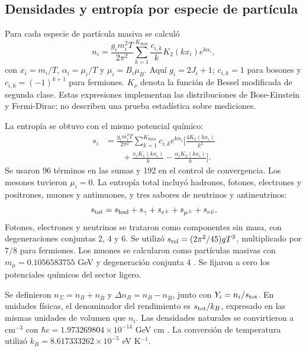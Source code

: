 \subsection{Densidades y entropía por especie de partícula}
Para cada especie de partícula masiva se calculó
\begin{equation}
n_i=\frac{g_i m_i^2T}{2\pi^2}
\sum_{k=1}^{K_{\max}}\frac{c_{i,k}}{k}
K_2(kx_i)e^{k\alpha_i},\label{eq:number}
\end{equation}
con $x_i=m_i/T$, $\alpha_i=\mu_i/T$ y $\mu_i=B_i\mu_B$. Aquí $g_i=2J_i+1$; $c_{i,k}=1$ para bosones y $c_{i,k}=(-1)^{k+1}$ para fermiones. $K_\nu$ denota la función de Bessel modificada de segunda clase. Estas expresiones implementan las distribuciones de Bose-Einstein y Fermi-Dirac; no describen una prueba estadística sobre mediciones.

La entropía se obtuvo con el mismo potencial químico:
\begin{align}
s_i&=\frac{g_i m_i^2T}{2\pi^2}
\sum_{k=1}^{K_{\max}}c_{i,k}e^{k\alpha_i}\bigg[
\frac{4K_2(kx_i)}{k^2}\nonumber\\
&\qquad+\frac{x_iK_1(kx_i)}{k}
-\frac{\alpha_iK_2(kx_i)}{k}\bigg].\label{eq:entropy}
\end{align}
Se usaron 96 términos en las sumas y 192 en el control de convergencia. Los mesones tuvieron $\mu_i=0$. La entropía total incluyó hadrones, fotones, electrones y positrones, muones y antimuones, y tres sabores de neutrinos y antineutrinos:
\begin{equation}
s_{\rm tot}=s_{\rm had}+s_\gamma+s_{e^\pm}
+s_{\mu^\pm}+s_{\nu\bar\nu}.\label{eq:stotal}
\end{equation}
Fotones, electrones y neutrinos se trataron como componentes sin masa, con degeneraciones conjuntas 2, 4 y 6. Se utilizó $s_{\rm rel}=(2\pi^2/45)gT^3$, multiplicado por $7/8$ para fermiones. Los muones se calcularon como partículas masivas con $m_\mu=0.1056583755$ GeV y degeneración conjunta 4 \citep{PDG2025}. Se fijaron a cero los potenciales químicos del sector ligero.

Se definieron $n_\Sigma=n_B+n_{\bar B}$ y $\Delta n_B=n_B-n_{\bar B}$, junto con $Y_i=n_i/s_{\rm tot}$. En unidades físicas, el denominador del rendimiento es $s_{\rm tot}/k_B$, expresado en las mismas unidades de volumen que $n_i$. Las densidades naturales se convirtieron a cm$^{-3}$ con $\hbar c=1.973269804\times10^{-14}$ GeV cm \citep{Robinson2025}. La conversión de temperatura utilizó $k_B=8.617333262\times10^{-5}$ eV K$^{-1}$.


